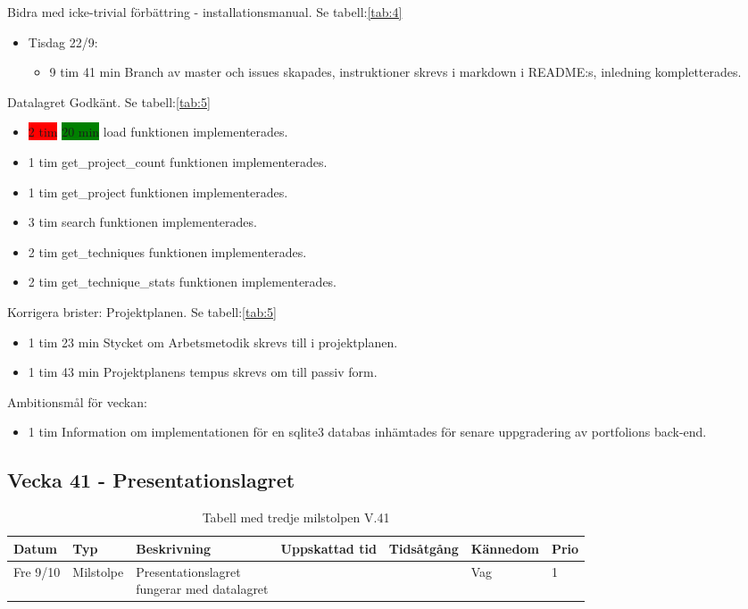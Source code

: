 \documentclass{TDP003mall}
\begin{document}
Bidra med icke-trivial förbättring - installationsmanual. Se tabell:\ref{tab:4}
\begin{itemize}
\item Tisdag 22/9:
  \begin{itemize}
  \item 9 tim 41 min Branch av master och issues skapades, instruktioner skrevs i markdown i README:s, inledning kompletterades.
  \end{itemize}
  \end{itemize}

Datalagret Godkänt. Se tabell:\ref{tab:5}
\begin{itemize}
\item \colorbox{red}{2 tim} \colorbox{green}{20 min} load funktionen implementerades.
\item 1 tim get\_project\_count funktionen implementerades.
\item 1 tim get\_project funktionen implementerades.
\item 3 tim search funktionen implementerades.
\item 2 tim get\_techniques funktionen implementerades.
\item 2 tim get\_technique\_stats funktionen implementerades.
\end{itemize}

Korrigera brister: Projektplanen. Se tabell:\ref{tab:5}
\begin{itemize}
\item 1 tim 23 min Stycket om Arbetsmetodik skrevs till i projektplanen.
  \item 1 tim 43 min Projektplanens tempus skrevs om till passiv form.
  \end{itemize}

Ambitionsmål för veckan:
\begin{itemize}
\item 1 tim Information om implementationen för en sqlite3 databas inhämtades för senare uppgradering av portfolions back-end.
  \end{itemize}


  
  \subsection*{Vecka 41 - Presentationslagret}
  \begin{table}[h!]
      \label{tab:6}
  \begin{tabularx}{\linewidth}{|l|l|X|l|l|l|l|}
  \hline
  Datum          & Typ       & Beskrivning                                                  & Uppskattad tid & Tidsåtgång & Kännedom & Prio \\ [0.5ex]
  \hline                                             
        Fre 9/10 & Milstolpe & \makecell[tl]{Presentationslagret \\fungerar med datalagret} &                &            & Vag      & 1 \\
    \hline
  \end{tabularx}
          \caption{Tabell med tredje milstolpen V.41}      
        \end{table}
        
\end{document}
